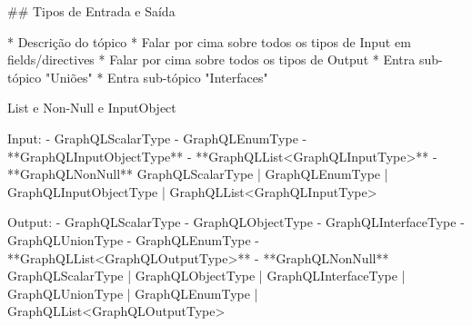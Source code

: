 ## Tipos de Entrada e Saída

* Descrição do tópico
* Falar por cima sobre todos os tipos de Input em fields/directives
* Falar por cima sobre todos os tipos de Output
* Entra sub-tópico "Uniões"
* Entra sub-tópico "Interfaces"

List e Non-Null e InputObject

Input:
- GraphQLScalarType
- GraphQLEnumType
- **GraphQLInputObjectType**
- **GraphQLList<GraphQLInputType>**
- **GraphQLNonNull**
    GraphQLScalarType |
    GraphQLEnumType |
    GraphQLInputObjectType |
    GraphQLList<GraphQLInputType>

Output:
- GraphQLScalarType
- GraphQLObjectType
- GraphQLInterfaceType
- GraphQLUnionType
- GraphQLEnumType
- **GraphQLList<GraphQLOutputType>**
- **GraphQLNonNull**
    GraphQLScalarType |
    GraphQLObjectType |
    GraphQLInterfaceType |
    GraphQLUnionType |
    GraphQLEnumType |
    GraphQLList<GraphQLOutputType>
